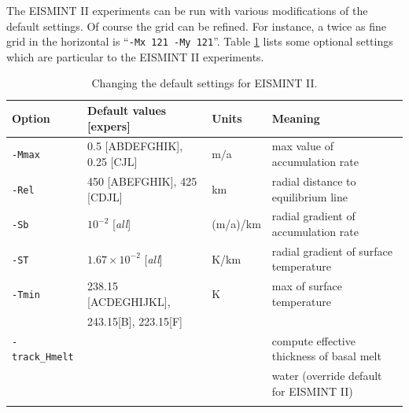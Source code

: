 \documentclass[11pt,final]{amsart}
\renewcommand{\t}[1]{\texttt{#1}}
\begin{document}
The EISMINT II experiments can be run with various modifications of the default settings.  Of course the grid can be refined.  For instance, a twice as fine grid in the horizontal is ``\t{-Mx 121 -My 121}''.  Table \ref{tab:eisIIoptions} lists some optional settings which are particular to the EISMINT II experiments.

\begin{table}[ht]
\caption{Changing the default settings for EISMINT II.}\label{tab:eisIIoptions}
\small
\begin{tabular}{@{}llll}\hline
\textbf{Option} & \textbf{Default values [expers]} & \textbf{Units} & \textbf{Meaning} \\ \hline
\verb|-Mmax| & 0.5 [ABDEFGHIK], 0.25 [CJL] & m$/$a & max value of accumulation rate \\
\verb|-Rel| & 450 [ABEFGHIK], 425 [CDJL] & km & radial distance to equilibrium line \\
\verb|-Sb| & $10^{-2}$ [\emph{all}] & (m/a)/km & radial gradient of accumulation rate \\
\verb|-ST| & $1.67 \times 10^{-2}$ [\emph{all}] & K/km & radial gradient of surface temperature\\
\verb|-Tmin| & 238.15 [ACDEGHIJKL], & K & max of surface temperature \\
 & 243.15[B], 223.15[F] & & \\
\verb|-track_Hmelt| &  &  & compute effective thickness of basal melt \\
 &  &  & water (override default for EISMINT II) \\
\hline\normalsize
\end{tabular}\end{table}
\end{document}
